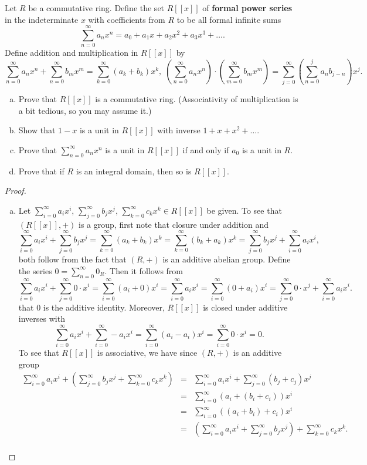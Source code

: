\documentclass[10pt]{amsart}
\begin{document}
\begin{thm}
  Let $R$ be a commutative ring.
  Define the set $R[[x]]$ of {\bf formal power series} in the indeterminate $x$ with coefficients from $R$ to be all formal infinite sums
  $$\sum_{n=0}^\infty a_nx^n = a_0 + a_1x + a_2 x^2 + a_3x^3 + \ldots.$$
  Define addition and multiplication in $R[[x]]$ by
  $$\sum_{n=0}^\infty a_nx^n + \sum_{n=0}^\infty b_mx^m = \sum_{k=0}^\infty (a_k + b_k)x^k,\; \left(\sum_{n=0}^\infty a_nx^n\right) \cdot \left(\sum_{m=0}^\infty b_mx^m\right) = \sum_{j=0}^\infty\left(\sum_{n=0}^j a_nb_{j-n}\right)x^j.$$
  \begin{enumerate}[(a)]
  \item
    Prove that $R[[x]]$ is a commutative ring.
    (Associativity of multiplication is a bit tedious, so you may assume it.)
  \item
    Show that $1-x$ is a unit in $R[[x]]$ with inverse $1 + x + x^2 + \ldots$.
  \item
    Prove that $\sum_{n=0}^\infty a_nx^n$ is a unit in $R[[x]]$ if and only if $a_0$ is a unit in $R$.
  \item
    Prove that if $R$ is an integral domain, then so is $R[[x]]$.
  \end{enumerate}

  \begin{proof}
    \begin{enumerate}[(a)]
    \item
      Let $\sum_{i=0}^\infty a_ix^i$, $\sum_{j=0}^\infty b_jx^j$, $\sum_{k=0}^\infty c_kx^k \in R[[x]]$ be given.
      To see that $(R[[x]], +)$ is a group, first note that closure under addition and
      $$\sum_{i=0}^\infty a_ix^i + \sum_{j=0}^\infty b_jx^j = \sum_{k=0}^\infty (a_k + b_k)x^k = \sum_{k=0}^\infty (b_k + a_k)x^k = \sum_{j=0}^\infty b_jx^j + \sum_{i=0}^\infty a_ix^i,$$
      both follow from the fact that $(R, +)$ is an additive abelian group.
      Define the series $0 = \sum_{n=0}^\infty 0_R$.
      Then it follows from
      $$\sum_{i=0}^\infty a_ix^i + \sum_{j=0}^\infty 0\cdot x^i = \sum_{i=0}^\infty (a_i + 0)x^i = \sum_{i=0}^\infty a_ix^i = \sum_{i=0}^\infty (0 + a_i)x^i = \sum_{j=0}^\infty 0\cdot x^j + \sum_{i=0}^\infty a_ix^i.$$
      that $0$ is the additive identity.
      Moreover, $R[[x]]$ is closed under additive inverses with
      $$\sum_{i=0}^\infty a_ix^i + \sum_{i=0}^\infty -a_ix^i = \sum_{i=0}^\infty (a_i - a_i)x^i = \sum_{i=0}^\infty 0\cdot x^i = 0.$$
      To see that $R[[x]]$ is associative, we have since $(R,+)$ is an additive group
      \begin{eqnarray*}
        \sum_{i=0}^\infty a_ix^i + \left(\sum_{j=0}^\infty b_jx^j + \sum_{k=0}^\infty c_kx^k\right) & = & \sum_{i=0}^\infty a_ix^i + \sum_{j=0}^\infty (b_j + c_j)x^j\\
        & = & \sum_{i=0}^\infty \left(a_i + (b_i + c_i)\right)x^i\\
        & = & \sum_{i=0}^\infty \left((a_i + b_i) + c_i\right)x^i\\
        & = & \left(\sum_{i=0}^\infty a_ix^i + \sum_{j=0}^\infty b_jx^j\right) + \sum_{k=0}^\infty c_kx^k.\\
      \end{eqnarray*}
      

\end{enumerate}
\end{proof}
\end{thm}
\end{document}
